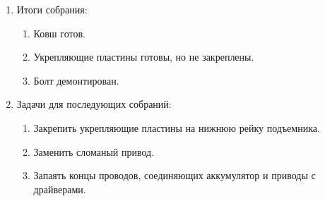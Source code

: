 \begin{enumerate}
	\item Итоги собрания:
	\begin{enumerate}
		\item Ковш готов.
		
		\item Укрепляющие пластины готовы, но не закреплены.
		
		\item Болт демонтирован.
		
	\end{enumerate}
	
	\item Задачи для последующих собраний:
	\begin{enumerate}
		\item Закрепить укрепляющие пластины на нижнюю рейку подъемника.
		
		\item Заменить сломаный привод.
		
		\item Запаять концы проводов, соединяющих аккумулятор и приводы с драйверами.		
	\end{enumerate}
\end{enumerate}
\fillpage
